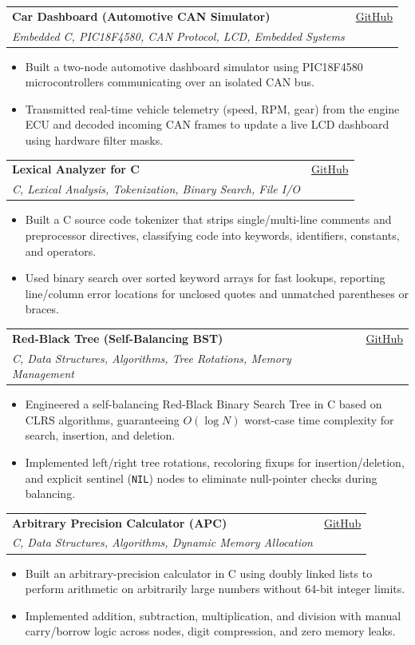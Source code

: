 \documentclass[letterpaper,11pt]{article}
\makeatletter
\newcommand{\resumeItem}[1]{
  \item
    {#1 \vspace{-3pt}}
}
\newcommand{\resumeSubheading}[4]{
  \vspace{-2pt}\item
    \begin{tabular*}{0.97\textwidth}[t]{l@{\extracolsep{\fill}}r}
      \textbf{#1} & #2 \\
      \textit{#3} & {#4} \\
    \end{tabular*}\vspace{-7pt}
}
\newcommand{\resumeItemListStart}{\begin{itemize}[topsep=2pt, itemsep=1pt, parsep=0pt]}
\newcommand{\resumeItemListEnd}{\end{itemize}\vspace{-6pt}}
\makeatother
\begin{document}
    \resumeSubheading
      {Car Dashboard (Automotive CAN Simulator)}{\href{https://github.com/k0-R0/Car_Dashboard}{GitHub}}
      {Embedded C, PIC18F4580, CAN Protocol, LCD, Embedded Systems}{}
      \resumeItemListStart
        \resumeItem{Built a two-node automotive dashboard simulator using PIC18F4580 microcontrollers communicating over an isolated CAN bus.}
        \resumeItem{Transmitted real-time vehicle telemetry (speed, RPM, gear) from the engine ECU and decoded incoming CAN frames to update a live LCD dashboard using hardware filter masks.}
      \resumeItemListEnd

    \resumeSubheading
      {Lexical Analyzer for C}{\href{https://github.com/k0-R0/Lexical-Analyzer}{GitHub}}
      {C, Lexical Analysis, Tokenization, Binary Search, File I/O}{}
      \resumeItemListStart
        \resumeItem{Built a C source code tokenizer that strips single/multi-line comments and preprocessor directives, classifying code into keywords, identifiers, constants, and operators.}
        \resumeItem{Used binary search over sorted keyword arrays for fast lookups, reporting line/column error locations for unclosed quotes and unmatched parentheses or braces.}
      \resumeItemListEnd

  \newpage

    \resumeSubheading
      {Red-Black Tree (Self-Balancing BST)}{\href{https://github.com/k0-R0/RedBlack_Tree}{GitHub}}
      {C, Data Structures, Algorithms, Tree Rotations, Memory Management}{}
      \resumeItemListStart
        \resumeItem{Engineered a self-balancing Red-Black Binary Search Tree in C based on CLRS algorithms, guaranteeing $O(\log N)$ worst-case time complexity for search, insertion, and deletion.}
        \resumeItem{Implemented left/right tree rotations, recoloring fixups for insertion/deletion, and explicit sentinel (\texttt{NIL}) nodes to eliminate null-pointer checks during balancing.}
      \resumeItemListEnd

    \resumeSubheading
      {Arbitrary Precision Calculator (APC)}{\href{https://github.com/k0-R0/APC}{GitHub}}
      {C, Data Structures, Algorithms, Dynamic Memory Allocation}{}
      \resumeItemListStart
        \resumeItem{Built an arbitrary-precision calculator in C using doubly linked lists to perform arithmetic on arbitrarily large numbers without 64-bit integer limits.}
        \resumeItem{Implemented addition, subtraction, multiplication, and division with manual carry/borrow logic across nodes, digit compression, and zero memory leaks.}
      \resumeItemListEnd
\end{document}
